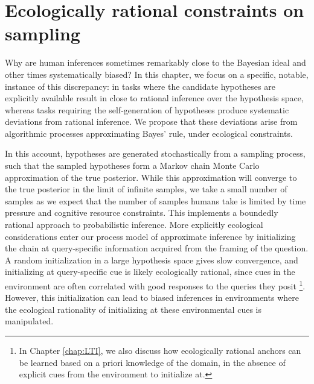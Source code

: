 
\chapter{Ecologically rational constraints on sampling}
\label{chap:MCMC}

Why are human inferences sometimes remarkably close to the Bayesian ideal and other times systematically biased? In this chapter, we focus on a specific, notable, instance of this discrepancy: in tasks where the candidate hypotheses are explicitly available result in close to rational inference over the hypothesis space, whereas tasks requiring the self-generation of hypotheses produce systematic deviations from rational inference. We propose that these deviations arise from algorithmic processes approximating Bayes’ rule, under ecological constraints.

In this account, hypotheses are generated stochastically from a sampling process, such that the sampled hypotheses form a Markov chain Monte Carlo approximation of the true posterior. While this approximation will converge to the true posterior in the limit of infinite samples, we take a small number of samples as we expect that the number of samples humans take is limited by time pressure and cognitive resource constraints. This implements a boundedly rational approach to probabilistic inference. More explicitly ecological considerations enter our process model of approximate inference by initializing the chain at query-specific information acquired from the framing of the question. A random initialization in a large hypothesis space gives slow convergence, and initializing at query-specific cue is likely ecologically rational, since cues in the environment are often correlated with good responses to the queries they posit \footnote{In Chapter \ref{chap:LTI}, we also discuss how ecologically rational anchors can be learned based on a priori knowledge of the domain, in the absence of explicit cues from the environment to initialize at.}. However, this initialization can lead to biased inferences in environments where the ecological rationality of initializing at these environmental cues is manipulated. 

